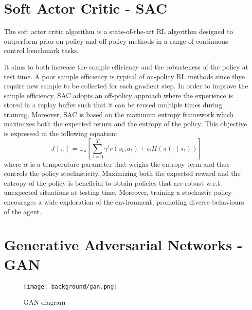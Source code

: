 \section{Soft Actor Critic - SAC}
The soft actor critic algorithm \citep{art:sac} is a state-of-the-art RL algorithm designed to outperform prior on-policy and off-policy methods in a range of continuous control benchmark tasks. 

It aims to both increase the sample efficiency and the robusteness of the policy at test time. A poor sample efficiency is typical of on-policy RL methods since thye require new sample to be collected for each gradient step. In order to improve the sample efficiency, SAC adopts an off-policy approach where the experience is stored in a replay buffer such that it can be reused multiple times during training. Moreover, SAC is based on the maximum entropy framework which maximizes both the expected return and the entropy of the policy. This objective is expressed in the following equation:
\begin{equation}
  J(\pi)=\mathbb{E}_{\pi}[\sum _{t=0}^{T}\gamma ^{t}r(s_{t},a_{t})+\alpha H(\pi(\cdot \mid s_{t}))]
\end{equation}
where $\alpha$ is a temperature parameter that weighs the entropy term and thus controls the policy stochasticity, Maximizing both the expected reward and the entropy of the policy is beneficial to obtain policies that are robust w.r.t. unexpected situations at testing time. Moreover, training a stochastic policy encourages a wide exploration of the environment, promoting diverse behaviours of the agent.

\section{Generative Adversarial Networks - GAN}
\begin{wrapfigure}{r}{0.6\textwidth}
  \begin{center}
    \texttt{[image: background/gan.png]}
  \end{center}
  \caption{GAN diagram}
  \label{fig:gan}
\end{wrapfigure}

